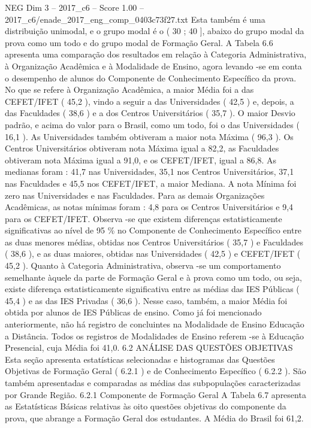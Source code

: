 \begin{textsample}{NEG Dim 3 – 2017\_c6 – Score 1.00 – 2017\_c6/enade\_2017\_eng\_comp\_0403c73f27.txt}
Esta também é uma distribuição unimodal, e o grupo modal é o ( 30 ; 40 ], abaixo do grupo modal da prova como um todo e do grupo modal de Formação Geral.
A Tabela 6.6 apresenta uma comparação dos resultados em relação à Categoria Administrativa, à Organização Acadêmica e à Modalidade de Ensino, agora levando -se em conta o desempenho de alunos do Componente de Conhecimento Específico da prova.
No que se refere à Organização Acadêmica, a maior Média foi a das CEFET/IFET ( 45,2 ), vindo a seguir a das Universidades ( 42,5 ) e, depois, a das Faculdades ( 38,6 ) e a dos Centros Universitários ( 35,7 ).
O maior Desvio padrão, e acima do valor para o Brasil, como um todo, foi o das Universidades ( 16,1 ).
As Universidades também obtiveram a maior nota Máxima ( 96,3 ).
Os Centros Universitários obtiveram nota Máxima igual a 82,2, as Faculdades obtiveram nota Máxima igual a 91,0, e os CEFET/IFET, igual a 86,8.
As medianas foram : 41,7 nas Universidades, 35,1 nos Centros Universitários, 37,1 nas Faculdades e 45,5 nos CEFET/IFET, a maior Mediana.
A nota Mínima foi zero nas Universidades e nas Faculdades.
Para as demais Organizações Acadêmicas, as notas mínimas foram : 4,8 para os Centros Universitários e 9,4 para os CEFET/IFET.
Observa -se que existem diferenças estatisticamente significativas ao nível de 95 \% no Componente de Conhecimento Específico entre as duas menores médias, obtidas nos Centros Universitários ( 35,7 ) e Faculdades ( 38,6 ), e as duas maiores, obtidas nas Universidades ( 42,5 ) e CEFET/IFET ( 45,2 ).
Quanto à Categoria Administrativa, observa -se um comportamento semelhante àquele da parte de Formação Geral e à prova como um todo, ou seja, existe diferença estatisticamente significativa entre as médias das IES Públicas ( 45,4 ) e as das IES Privadas ( 36,6 ).
Nesse caso, também, a maior Média foi obtida por alunos de IES Públicas de ensino.
Como já foi mencionado anteriormente, não há registro de concluintes na Modalidade de Ensino Educação a Distância.
Todos os registros de Modalidades de Ensino referem -se à Educação Presencial, cuja Média foi 41,0. 6.2 ANÁLISE DAS QUESTÕES OBJETIVAS Esta seção apresenta estatísticas selecionadas e histogramas das Questões Objetivas de Formação Geral ( 6.2.1 ) e de Conhecimento Específico ( 6.2.2 ).
São também apresentadas e comparadas as médias das subpopulações caracterizadas por Grande Região. 6.2.1 Componente de Formação Geral A Tabela 6.7 apresenta as Estatísticas Básicas relativas às oito questões objetivas do componente da prova, que abrange a Formação Geral dos estudantes.
A Média do Brasil foi 61,2.

\end{textsample}
